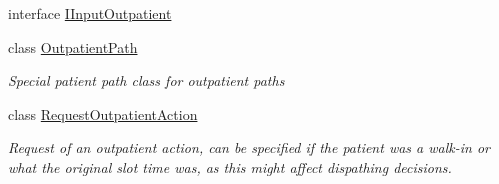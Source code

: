 \begin{DoxyCompactItemize}
interface \hyperlink{interface_general_health_care_elements_1_1_department_models_1_1_outpatient_1_1_i_input_outpatient}{I\+Input\+Outpatient}
\item 
class \hyperlink{class_general_health_care_elements_1_1_department_models_1_1_outpatient_1_1_outpatient_path}{Outpatient\+Path}
\begin{DoxyCompactList}\small\item\em Special patient path class for outpatient paths \end{DoxyCompactList}\item 
class \hyperlink{class_general_health_care_elements_1_1_department_models_1_1_outpatient_1_1_request_outpatient_action}{Request\+Outpatient\+Action}
\begin{DoxyCompactList}\small\item\em Request of an outpatient action, can be specified if the patient was a walk-\/in or what the original slot time was, as this might affect dispathing decisions. \end{DoxyCompactList}\end{DoxyCompactItemize}
